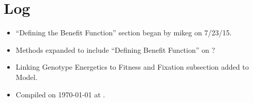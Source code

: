 \documentclass{article}
\begin{document}
\section*{Log}
\begin{itemize}
\item ``Defining the Benefit Function'' section began by mikeg on 7/23/15.
\item Methods expanded to include ``Defining Benefit Function'' on ?
\item {Linking Genotype Energetics to Fitness and Fixation} subsection added to Model.
\item Compiled on \today\xspace at \currenttime. 
\end{itemize}
\end{document}
